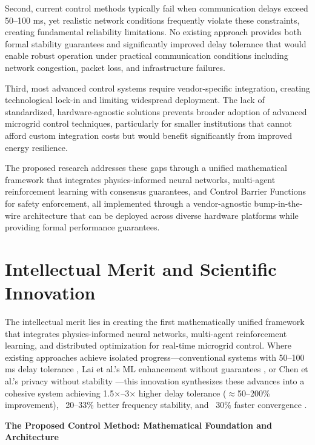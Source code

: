 \documentclass[12pt]{article}
\begin{document}
Second, current control methods typically fail when communication delays exceed 50--100 ms, yet realistic network conditions frequently violate these constraints, creating fundamental reliability limitations. No existing approach provides both formal stability guarantees and significantly improved delay tolerance that would enable robust operation under practical communication conditions including network congestion, packet loss, and infrastructure failures.

Third, most advanced control systems require vendor-specific integration, creating technological lock-in and limiting widespread deployment. The lack of standardized, hardware-agnostic solutions prevents broader adoption of advanced microgrid control techniques, particularly for smaller institutions that cannot afford custom integration costs but would benefit significantly from improved energy resilience.

The proposed research addresses these gaps through a unified mathematical framework that integrates physics-informed neural networks, multi-agent reinforcement learning with consensus guarantees, and Control Barrier Functions for safety enforcement, all implemented through a vendor-agnostic bump-in-the-wire architecture that can be deployed across diverse hardware platforms while providing formal performance guarantees.
\vspace{-0.5cm}
\section{Intellectual Merit and Scientific Innovation}

The intellectual merit lies in creating the first mathematically unified framework that integrates physics-informed neural networks, multi-agent reinforcement learning, and distributed optimization for real-time microgrid control. Where existing approaches achieve isolated progress---conventional systems with 50--100 ms delay tolerance \cite{bidram2012,simpson2013,riverso2013}, Lai et al.'s ML enhancement without guarantees \cite{lai2023}, or Chen et al.'s privacy without stability \cite{chen2024}---this innovation synthesizes these advances into a cohesive system achieving 1.5×--3× higher delay tolerance ($\approx$50--200\% improvement), ~20--33\% better frequency stability, and ~30\% faster convergence \cite{bevrani2021,palizban2014,our2024comparative}.

\textbf{The Proposed Control Method: Mathematical Foundation and Architecture}
\end{document}
